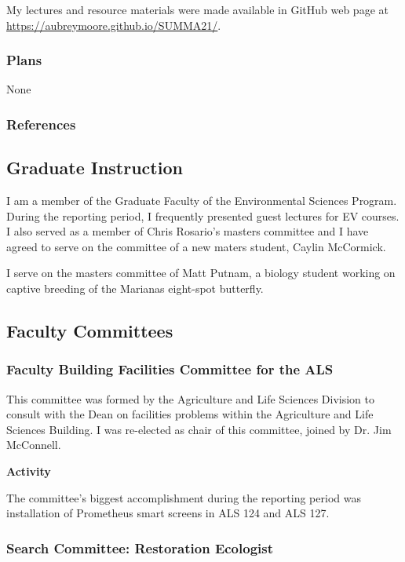 \begin{refsection}
My lectures and resource materials were made available in GitHub web page at \url{https://aubreymoore.github.io/SUMMA21/}.

\subsubsection{Plans}

None

\subsubsection{References}
\printbibliography[heading=none]
\end{refsection}

\subsection{Graduate Instruction}

I am a member of the Graduate Faculty of the Environmental Sciences Program. During the reporting period, I frequently presented guest lectures for EV courses. I also served as a member of Chris Rosario's masters committee and I have agreed to serve on the committee of a new maters student, Caylin McCormick.

I serve on the masters committee of Matt Putnam, a biology student working on captive breeding of the Marianas eight-spot butterfly. 

\subsection{Faculty Committees}

\subsubsection{Faculty Building Facilities Committee for the ALS}

This committee was formed by the Agriculture and Life Sciences Division
to consult with the Dean on facilities problems within the Agriculture
and Life Sciences Building. I was re-elected as chair of this committee, joined by Dr. Jim McConnell.

\raggedright\vspace{2mm}\textbf{Activity}
	
The committee's biggest accomplishment during the reporting period was installation of Prometheus smart screens in ALS 124 and ALS 127.

\subsubsection{Search Committee: Restoration Ecologist}

